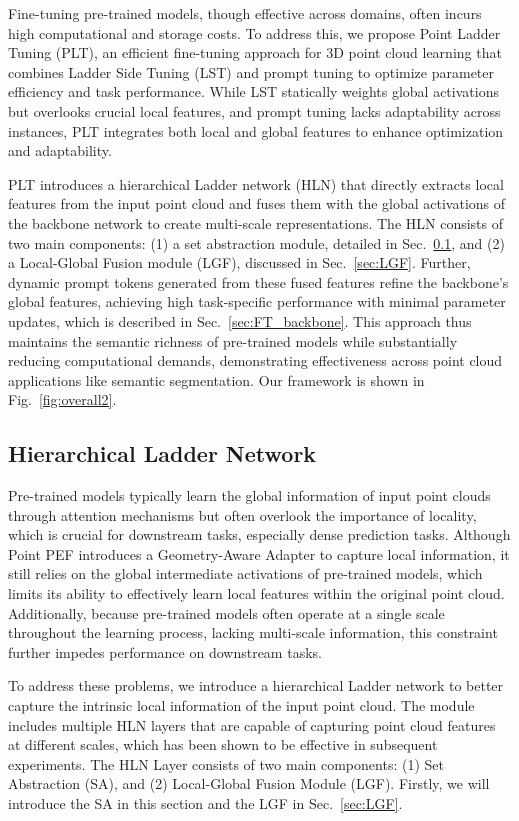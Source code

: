 Fine-tuning pre-trained models, though effective across domains, often incurs high computational and storage costs. To address this, we propose Point Ladder Tuning (PLT), an efficient fine-tuning approach for 3D point cloud learning that combines Ladder Side Tuning (LST) and prompt tuning to optimize parameter efficiency and task performance. While LST statically weights global activations but overlooks crucial local features, and prompt tuning lacks adaptability across instances, PLT integrates both local and global features to enhance optimization and adaptability.

PLT introduces a hierarchical Ladder network (HLN) that directly extracts local features from the input point cloud and fuses them with the global activations of the backbone network to create multi-scale representations. The HLN consists of two main components: (1) a set abstraction module, detailed in Sec.~\ref{sec:HLN}, and (2) a Local-Global Fusion module (LGF), discussed in Sec.~\ref{sec:LGF}. Further, dynamic prompt tokens generated from these fused features refine the backbone’s global features, achieving high task-specific performance with minimal parameter updates, which is described in Sec.~\ref{sec:FT_backbone}. This approach thus maintains the semantic richness of pre-trained models while substantially reducing computational demands, demonstrating effectiveness across point cloud applications like semantic segmentation.
Our framework is shown in Fig.~\ref{fig:overall2}.


\subsection{Hierarchical Ladder Network}
\label{sec:HLN}
Pre-trained models typically learn the global information of input point clouds through attention mechanisms but often overlook the importance of locality, which is crucial for downstream tasks, especially dense prediction tasks. Although Point PEF introduces a Geometry-Aware Adapter to capture local information, it still relies on the global intermediate activations of pre-trained models, which limits its ability to effectively learn local features within the original point cloud. Additionally, because pre-trained models often operate at a single scale throughout the learning process, lacking multi-scale information, this constraint further impedes performance on downstream tasks.

To address these problems, we introduce a hierarchical Ladder network to better capture the intrinsic local information of the input point cloud. The module includes multiple HLN layers that are capable of capturing point cloud features at different scales, which has been shown to be effective in subsequent experiments. The HLN Layer consists of two main components: (1) Set Abstraction (SA), and (2) Local-Global Fusion Module (LGF). Firstly, we will introduce the SA in this section and the LGF in Sec.~\ref{sec:LGF}.

